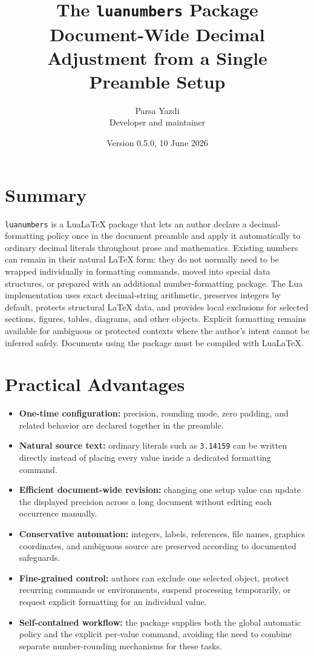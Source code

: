 \documentclass[11pt]{article}
\title{The \texttt{luanumbers} Package\\\large Document-Wide Decimal Adjustment from a Single Preamble Setup}
\author{Parsa Yazdi\\\small Developer and maintainer}
\date{Version 0.5.0, 10 June 2026}
\begin{document}
\maketitle

\section*{Summary}

\texttt{luanumbers} is a LuaLaTeX package that lets an author declare a
decimal-formatting policy once in the document preamble and apply it
automatically to ordinary decimal literals throughout prose and mathematics.
Existing numbers can remain in their natural LaTeX form: they do not normally
need to be wrapped individually in formatting commands, moved into special data
structures, or prepared with an additional number-formatting package. The Lua
implementation uses exact decimal-string arithmetic, preserves integers by
default, protects structural LaTeX data, and provides local exclusions for
selected sections, figures, tables, diagrams, and other objects. Explicit
formatting remains available for ambiguous or protected contexts where the
author's intent cannot be inferred safely. Documents using the package must be
compiled with LuaLaTeX.

\section*{Practical Advantages}

\begin{itemize}
  \item \textbf{One-time configuration:} precision, rounding mode, zero
    padding, and related behavior are declared together in the preamble.
  \item \textbf{Natural source text:} ordinary literals such as
    \texttt{3.14159} can be written directly instead of placing every value
    inside a dedicated formatting command.
  \item \textbf{Efficient document-wide revision:} changing one setup value
    can update the displayed precision across a long document without editing
    each occurrence manually.
  \item \textbf{Conservative automation:} integers, labels, references, file
    names, graphics coordinates, and ambiguous source are preserved according
    to documented safeguards.
  \item \textbf{Fine-grained control:} authors can exclude one selected object,
    protect recurring commands or environments, suspend processing temporarily,
    or request explicit formatting for an individual value.
  \item \textbf{Self-contained workflow:} the package supplies both the global
    automatic policy and the explicit per-value command, avoiding the need to
    combine separate number-rounding mechanisms for these tasks.
\end{itemize}
\end{document}

